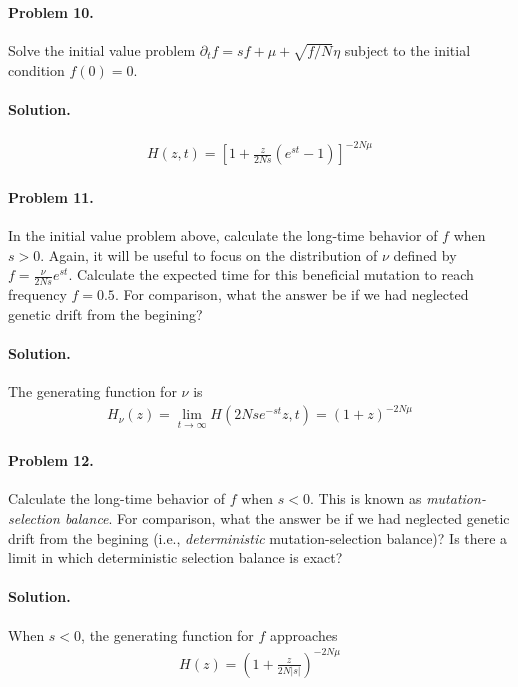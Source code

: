 \documentclass[11pt]{article}
\begin{document}
\paragraph{Problem 10.} Solve the initial value problem $\partial_t f = s f + \mu + \sqrt{f/N} \eta$ subject to the initial condition $f(0)=0$. 

\paragraph{Solution.}
\begin{align}
H(z,t) = \left[ 1 + \frac{z}{2Ns} \left( e^{st} - 1 \right) \right]^{-2N\mu} 
\end{align}

\paragraph{Problem 11.} In the initial value problem above, calculate the long-time behavior of $f$ when $s>0$. Again, it will be useful to focus on the distribution of $\nu$ defined by $f = \frac{\nu}{2Ns} e^{st}$. Calculate the expected time for this beneficial mutation to reach frequency $f=0.5$. For comparison, what the answer be if we had neglected genetic drift from the begining? 

\paragraph{Solution.} The generating function for $\nu$ is 
\begin{align}
H_\nu(z) = \lim_{t \to \infty} H(2Ns e^{-st} z,t) = (1+z)^{-2N\mu} 
\end{align}

\paragraph{Problem 12.} Calculate the long-time behavior of $f$ when $s < 0$. This is known as \emph{mutation-selection balance}. For comparison, what the answer be if we had neglected genetic drift from the begining (i.e., \emph{deterministic} mutation-selection balance)? Is there a limit in which deterministic selection balance is exact?  

\paragraph{Solution.} When $s < 0$, the generating function for $f$ approaches
\begin{align}
H(z) = \left( 1 + \frac{z}{2N|s|} \right)^{-2N\mu}
\end{align}
\end{document}
